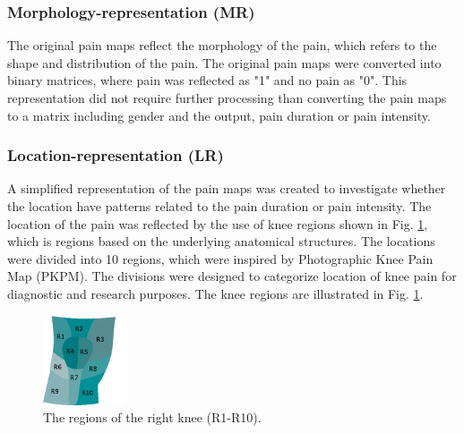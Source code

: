 \subsubsection{Morphology-representation (MR)}
The original pain maps reflect the morphology of the pain, which refers to the shape and distribution of the pain. The original pain maps were converted into binary matrices, where pain was reflected as "1" and no pain as "0". This representation did not require further processing than converting the pain maps to a matrix including gender and the output, pain duration or pain intensity. 

\subsubsection{Location-representation (LR)} 
A simplified representation of the pain maps was created to investigate whether the location have patterns related to the pain duration or pain intensity. The location of the pain was reflected by the use of knee regions shown in Fig. \ref{fig:atlas}, which is regions based on the underlying anatomical structures.
The locations were divided into 10 regions, which were inspired by Photographic Knee Pain Map (PKPM). The divisions were designed to categorize location of knee pain for diagnostic and research purposes.\citep{Elson2010} The knee regions are illustrated in Fig. \ref{fig:atlas}.

\begin{figure} [H] 
\centering
\includegraphics[width=0.22\textwidth]{Figures/atlas}
\caption{The regions of the right knee (R1-R10).}
\label{fig:atlas}
\end{figure}


